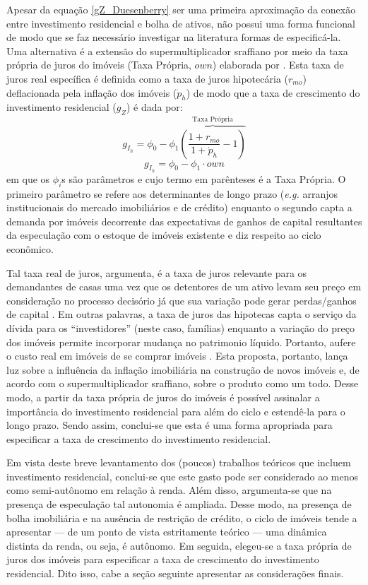 Apesar da equação \ref{gZ_Duesenberry} ser uma primeira aproximação da conexão entre investimento residencial e bolha de ativos, não possui uma forma funcional de modo que se faz necessário investigar na literatura formas de especificá-la.
Uma alternativa é a extensão do supermultiplicador sraffiano por meio da taxa própria de juros do imóveis (Taxa Própria, $own$) elaborada por \textcite{teixeira_crescimento_2015}. 
Esta taxa de juros real específica é definida como a taxa de juros hipotecária ($r_{mo}$) deflacionada pela inflação dos imóveis ({$\dot p_h$}) de modo que a taxa de crescimento do investimento residencial ($g_Z$) é dada por:
$$
g_{I_h} = \phi_0 - \phi_1 \overbrace{\left(\frac{1+r_{mo}}{1+\dot p_h} - 1\right)}^{\text{Taxa Própria}}
$$
\begin{equation}
\label{tx_Propria}
g_{I_h} = \phi_0 - \phi_1\cdot own
\end{equation}
em que os $\phi_i$s são parâmetros e cujo termo em parênteses é a Taxa Própria. 
O primeiro parâmetro se refere aos determinantes de longo prazo (\textit{e.g.} arranjos institucionais do mercado imobiliários e de crédito) enquanto o segundo capta a demanda por imóveis decorrente das expectativas de ganhos de capital resultantes da especulação com o estoque de imóveis existente e diz respeito ao ciclo econômico.

Tal taxa real de juros, argumenta, é a taxa de juros relevante para os demandantes de casas uma vez que os detentores de um ativo levam seu preço em consideração no processo decisório já que sua variação pode gerar perdas/ganhos de capital \cite[p.~144]{teixeira_crescimento_2015}.
Em outras palavras, a taxa de juros das hipotecas capta o serviço da dívida para os ``investidores'' (neste caso, famílias) enquanto a variação do preço dos imóveis permite incorporar mudança no patrimonio líquido. Portanto, aufere o custo real em imóveis de se comprar imóveis \cite[p.~53]{teixeira_crescimento_2015}. 
Esta proposta, portanto, lança luz sobre a influência da inflação imobiliária na construção de novos imóveis e, de acordo com o supermultiplicador sraffiano, sobre o produto como um todo. 
Desse modo, a partir da taxa própria de juros do imóveis é possível assinalar a importância do investimento residencial para além do ciclo e estendê-la para o longo prazo.  
Sendo assim, conclui-se que esta é uma forma apropriada para especificar a taxa de crescimento do investimento residencial.

Em vista deste breve levantamento dos (poucos) trabalhos teóricos que incluem investimento residencial, conclui-se que este gasto pode ser considerado ao menos como semi-autônomo em relação à renda.
Além disso, argumenta-se que na presença de especulação tal autonomia é ampliada. 
Desse modo, na presença de bolha imobiliária e na ausência de restrição de crédito, o ciclo de imóveis tende a apresentar --- de um ponto de vista estritamente teórico --- uma dinâmica distinta da renda, ou seja, é autônomo.
Em seguida, elegeu-se a taxa própria de juros dos imóveis para especificar a taxa de crescimento do investimento residencial.
Dito isso, cabe a seção seguinte apresentar as considerações finais.


